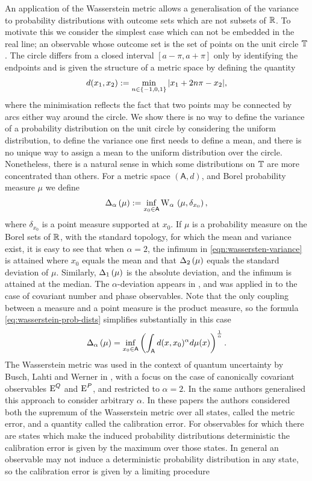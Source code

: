 An application of the Wasserstein metric allows a generalisation of the variance to probability distributions with outcome sets which are not subsets of $\mathbb{R}$. To motivate this we consider the simplest case which can not be embedded in the real line; an observable whose outcome set is the set of points on the unit circle $\mathbb{T}$. The circle differs from a closed interval $[a-\pi, a+\pi]$ only by identifying the endpoints and is given the structure of a metric space by defining the quantity
\begin{align}
  d(x_1,x_2) := \min_{n\in \{-1,0,1\}} {\left\lvert{x_1 + 2n\pi - x_2}\right\rvert},
\end{align}
where the minimisation reflects the fact that two points may be connected by arcs either way around the circle. We show there is no way to define the variance of a probability distribution on the unit circle by considering the uniform distribution, to define the variance one first needs to define a mean, and there is no unique way to assign a mean to the uniform distribution over the circle. Nonetheless, there is a natural sense in which some distributions on $\mathbb{T}$ are more concentrated than others. For a metric space $(\mathsf{A}, d)$, and Borel probability measure $\mu$ we define
\begin{align}
  \wsDev{\mu}[\alpha] \defeq \inf_{x_0\in\mathsf{A}} \ws{\mu, \delta_{x_0}}[\alpha], \label{eqn:wassersten-variance}
\end{align}
where $\delta_{x_0}$ is a point measure supported at $x_0$. If $\mu$ is a probability measure on the Borel sets of $\mathbb{R}$, with the standard topology, for which the mean and variance exist, it is easy to see that when $\alpha=2$, the infimum in \eqref{eqn:wassersten-variance} is attained where $x_0$ equals the mean and that $\wsDev{\mu}[2]$ equals the standard deviation of $\mu$. Similarly, $\wsDev{\mu}[1]$ is the absolute deviation, and the infimum is attained at the median. The $\alpha$-deviation appears in \cite{blw-meas-uncertainty}, and was applied in \cite{sharp-ur-num-angle} to the case of covariant number and phase observables. Note that the only coupling between a measure and a point measure is the product measure, so the formula \eqref{eq:wasserstein-prob-dists} simplifies substantially in this case
\begin{align}
  \wsDev{\mu}[\alpha] = \inf_{x_0\in\mathsf{A}} \left(\int_{\mathsf{A}} d(x,x_0)^\alpha d\mu(x)\right)^\frac{1}{\alpha}.
\end{align}
The Wasserstein metric was used in the context of quantum uncertainty by Busch, Lahti and Werner in \cite{PhysRevLett.111.160405}, with a focus on the case of canonically covariant observables $\operatorname{E}^Q$ and $\operatorname{E}^P$, and restricted to $\alpha=2$. In \cite{blw-meas-uncertainty} the same authors generalised this approach to consider arbitrary $\alpha$. In these papers the authors considered both the supremum of the Wasserstein metric over all states, called the metric error, and a quantity called the calibration error. For observables for which there are states which make the induced probability distributions deterministic the calibration error is given by the maximum over those states. In general an observable may not induce a deterministic probability distribution in any state, so the calibration error is given by a limiting procedure

